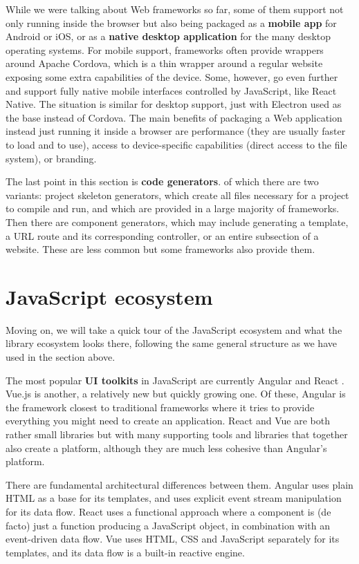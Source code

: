 \documentclass[english,odsaz]{fitthesis}
\begin{document}
While we were talking about Web frameworks so far, some of them support not only
running inside the browser but also being packaged as a \textbf{mobile app} for Android
or iOS, or as a \textbf{native desktop application} for the many desktop operating
systems. For mobile support, frameworks often provide wrappers around Apache
Cordova, which is a thin wrapper around a regular website exposing some extra
capabilities of the device. Some, however, go even further and support fully
native mobile interfaces controlled by JavaScript, like React Native. The
situation is similar for desktop support, just with Electron used as the base
instead of Cordova. The main benefits of packaging a Web application instead
just running it inside a browser are performance (they are usually faster to
load and to use), access to device-specific capabilities (direct access to the
file system), or branding.

The last point in this section is \textbf{code generators}. of which there are two
variants: project skeleton generators, which create all files necessary for a
project to compile and run, and which are provided in a large majority of
frameworks. Then there are component generators, which may include generating a
template, a URL route and its corresponding controller, or an entire subsection
of a website. These are less common but some frameworks also provide them.

\section{JavaScript ecosystem}
\label{sec:orgce26aba}
Moving on, we will take a quick tour of the JavaScript ecosystem and what the
library ecosystem looks there, following the same general structure as we have
used in the section above.

The most popular \textbf{UI toolkits} in JavaScript are currently Angular \cite{angular}
and React \cite{react}. Vue.js \cite{vuejs} is another, a relatively new but quickly
growing one. Of these, Angular is the framework closest to traditional
frameworks where it tries to provide everything you might need to create an
application. React and Vue are both rather small libraries but with many
supporting tools and libraries that together also create a platform, although
they are much less cohesive than Angular's platform.

There are fundamental architectural differences between them. Angular uses plain
HTML as a base for its templates, and uses explicit event stream manipulation
for its data flow. React uses a functional approach where a component is (de
facto) just a function producing a JavaScript object, in combination with an
event-driven data flow. Vue uses HTML, CSS and JavaScript separately for its
templates, and its data flow is a built-in reactive engine.
\end{document}
